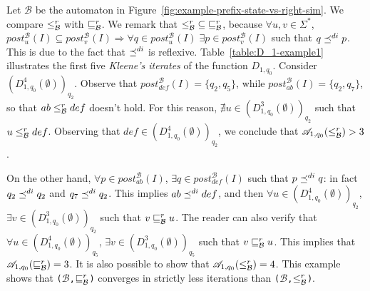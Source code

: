 \begin{example}
Let $\mathcal{B}$ be the automaton in Figure~\ref{fig:example-prefix-state-vs-right-sim}.
We compare $\leq_{\mathcal{B}}^{r}$ with $\sqsubseteq_{\mathcal{B}}^r$.
We remark that $\mathord{\leq_{\mathcal{B}}^{r}} \subseteq \mathord{\sqsubseteq_{\mathcal{B}}^r}$,
because $\forall u,v \in \Sigma^*$,
$post_u^{\mathcal{B}}(I) \subseteq post_v^{\mathcal{B}}(I) \Longrightarrow
\forall q \in post_u^{\mathcal{B}}(I) \; \exists p \in post_v^{\mathcal{B}}(I)$
such that $q \preceq^{di} p$.
This is due to the fact that $\preceq^{di}$ is reflexive.
Table~\ref{table:D_1-example1} illustrates the first five \emph{Kleene's iterates}
of the function $D_{1,q_0}$.
Consider $(D_{1,q_0}^4(\emptyset))_{q_2}$.
Observe that $post_{def}^{\mathcal{B}}(I) = \{q_2, q_5\}$, while
$post_{ab}^{\mathcal{B}}(I) = \{q_2, q_7\}$, so that $ab \leq_{\mathcal{B}}^{r} def$ doesn't hold.
For this reason, $\nexists u \in (D_{1,q_0}^3(\emptyset))_{q_2}$ such that $u \leq_{\mathcal{B}}^{r} def$.
Observing that $def \in (D_{1,q_0}^4(\emptyset))_{q_2}$, we conclude that
$\mathscr{A}_{1,q_0}(\leq_{\mathcal{B}}^{r}) > 3$.

On the other hand, $\forall p \in post_{ab}^{\mathcal{B}}(I)$,
$\exists q \in post_{def}^{\mathcal{B}}(I)$ such that $p \preceq^{di} q$:
in fact $q_2 \preceq^{di} q_2$ and $q_7 \preceq^{di} q_2$.
This implies $ab \preceq^{di} def$, and then $\forall u \in (D_{1,q_0}^4(\emptyset))_{q_2}$,
$\exists v \in (D_{1,q_0}^3 (\emptyset))_{q_2}$ such that $v \sqsubseteq_{\mathcal{B}}^r u$.
The reader can also verify that $\forall u \in (D_{1,q_0}^4(\emptyset))_{q_5}$,
$\exists v \in (D_{1,q_0}^3 (\emptyset))_{q_5}$ such that $v \sqsubseteq_{\mathcal{B}}^r u$.
This implies that $\mathscr{A}_{1,q_0}(\sqsubseteq_{\mathcal{B}}^r) = 3$.
It is also possible to show that $\mathscr{A}_{1,q_0}(\leq_{\mathcal{B}}^{r}) = 4$.
This example shows that \texttt{($\mathcal{B}$,$\sqsubseteq_{\mathcal{B}}^r$)} converges in
strictly less iterations than \texttt{($\mathcal{B}$,$\leq_{\mathcal{B}}^{r}$)}.
\end{example}

